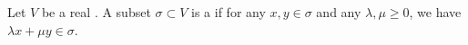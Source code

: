 \begin{definition} \label{definition:convex_cone_in_a_finite_dimensional_real_vector_space}
Let $V$ be a  real .
A subset $\sigma \subset V$ is a  if for any $x, y \in \sigma$ and any $\lambda, \mu \geq 0$, we have $\lambda x + \mu y \in \sigma$.
\end{definition}